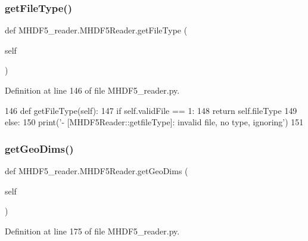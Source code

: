 \subsubsection{\texorpdfstring{get\+File\+Type()}{getFileType()}}
{\footnotesize\ttfamily def M\+H\+D\+F5\+\_\+reader.\+M\+H\+D\+F5\+Reader.\+get\+File\+Type (\begin{DoxyParamCaption}\item[{}]{self }\end{DoxyParamCaption})}



Definition at line 146 of file M\+H\+D\+F5\+\_\+reader.\+py.


\begin{DoxyCode}
146     \textcolor{keyword}{def }getFileType(self):
147         \textcolor{keywordflow}{if} self.validFile == 1:
148             \textcolor{keywordflow}{return} self.fileType
149         \textcolor{keywordflow}{else}:
150             print(\textcolor{stringliteral}{'- [MHDF5Reader::getfileType]: invalid file, no type, ignoring'})
151      
\end{DoxyCode}
\mbox{\label{class_m_h_d_f5__reader_1_1_m_h_d_f5_reader_aa433954c98bbb5384bbd25e523ca1925}} 
\subsubsection{\texorpdfstring{get\+Geo\+Dims()}{getGeoDims()}}
{\footnotesize\ttfamily def M\+H\+D\+F5\+\_\+reader.\+M\+H\+D\+F5\+Reader.\+get\+Geo\+Dims (\begin{DoxyParamCaption}\item[{}]{self }\end{DoxyParamCaption})}



Definition at line 175 of file M\+H\+D\+F5\+\_\+reader.\+py.


